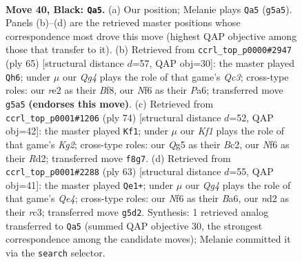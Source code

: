 \documentclass[11pt]{article}
\begin{document}
\clearpage

\begin{figure}[p]\centering
\begin{subfigure}{0.46\textwidth}\centering
\resizebox{\linewidth}{!}{%
\newchessgame
\chessboard[
  setfen={5k2/1b3p2/5np1/6qp/P7/6P1/1p1NRP1P/1R4K1 b - - 1 40},
  showmover=false,
  pgfstyle=straightmove, color=movearrow, markmove={g5-a5}
]}
\caption{}
\end{subfigure}\hfill
\begin{subfigure}{0.46\textwidth}\centering
\resizebox{\linewidth}{!}{%
\newchessgame
\chessboard[
  setfen={5bk1/1p3pp1/p1q5/3p1PR1/8/P3B3/1PP4P/1K1R4 b - - 0 33},
  showmover=false,
  pgfstyle=straightmove, color=movearrow, markmove={c6-h6}
]}
\caption{}
\end{subfigure}
\\[4pt]
\begin{subfigure}{0.46\textwidth}\centering
\resizebox{\linewidth}{!}{%
\newchessgame
\chessboard[
  setfen={8/1p4k1/p1p2r2/P3r1n1/1Q2p1b1/2P5/1PBR1PK1/8 w - - 6 38},
  showmover=false,
  pgfstyle=straightmove, color=movearrow, markmove={g2-f1}
]}
\caption{}
\end{subfigure}\hfill
\begin{subfigure}{0.46\textwidth}\centering
\resizebox{\linewidth}{!}{%
\newchessgame
\chessboard[
  setfen={1R6/p1P3pk/b3p2p/4qp2/8/2R4P/PPB3P1/7K b - - 6 32},
  showmover=false,
  pgfstyle=straightmove, color=movearrow, markmove={e5-e1}
]}
\caption{}
\end{subfigure}
\caption{\textbf{Move 40, Black: \texttt{Qa5}.} (a) Our position; Melanie plays \texttt{Qa5} (\texttt{g5a5}). Panels (b)--(d) are the retrieved master positions whose correspondence most drove this move (highest QAP objective among those that transfer to it). (b) Retrieved from \texttt{ccrl\_top\_p0000\#2947} (ply 65) [structural distance $d$=57, QAP obj=30]: the master played \texttt{Qh6}; under $\mu$ our \emph{Qg4} plays the role of that game's \emph{Qc3}; cross-type roles: our \emph{r}e2 as their \emph{B}f8, our \emph{N}f6 as their \emph{P}a6; transferred move \texttt{g5a5} \textbf{(endorses this move)}. (c) Retrieved from \texttt{ccrl\_top\_p0001\#1206} (ply 74) [structural distance $d$=52, QAP obj=42]: the master played \texttt{Kf1}; under $\mu$ our \emph{Kf1} plays the role of that game's \emph{Kg2}; cross-type roles: our \emph{Q}g5 as their \emph{B}c2, our \emph{N}f6 as their \emph{R}d2; transferred move \texttt{f8g7}. (d) Retrieved from \texttt{ccrl\_top\_p0001\#2288} (ply 63) [structural distance $d$=55, QAP obj=41]: the master played \texttt{Qe1+}; under $\mu$ our \emph{Qg4} plays the role of that game's \emph{Qe4}; cross-type roles: our \emph{N}f6 as their \emph{B}a6, our \emph{n}d2 as their \emph{r}c3; transferred move \texttt{g5d2}. Synthesis: 1 retrieved analog transferred to \texttt{Qa5} (summed QAP objective 30, the strongest correspondence among the candidate moves); Melanie committed it via the \texttt{search} selector.}
\label{fig:thought-m79}
\end{figure}
\end{document}
